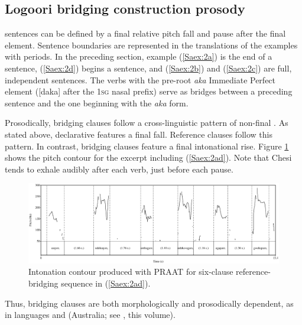 \documentclass[output=paper]{LSP/langsci}
\begin{document}
\subsection{Logoori bridging construction prosody}
\label{Saprosody}
  sentences can be defined by a final relative pitch fall and pause after the final element. Sentence boundaries are represented in the translations of the examples with periods. In the preceding section, example (\ref{Saex:2a}) is the end of a  sentence, (\ref{Saex:2d}) begins a  sentence, and (\ref{Saex:2b}) and (\ref{Saex:2c}) are full, independent  sentences. The verbs with the pre-root \textit{aka} Immediate Perfect element ([daka] after the \textsc{1sg} nasal prefix) serve as bridges between a preceding  sentence and the one beginning with the \textit{aka} form. 

Prosodically,  bridging clauses follow a cross-linguistic pattern of non-final  \citep{devries.2005}. As stated above,  declarative  features a final fall. Reference clauses follow this pattern. In contrast, bridging clauses feature a final intonational rise. Figure \ref{SaFig1} shows the pitch contour for the excerpt including (\ref{Saex:2ad}). Note that Chesi tends to exhale audibly after each verb, just before each pause.\nocite{PRAAT}


\begin{figure}[ht]
\includegraphics[width=\textwidth]{figures/sarvasyFig1.eps}
\caption{Intonation contour produced with PRAAT for six-clause reference-bridging sequence in (\ref{Saex:2ad}). \label{SaFig1}}
\end{figure}

Thus,  bridging clauses are both morphologically  and prosodically dependent, as in  languages and  (Australia; see , this volume).
\end{document}
